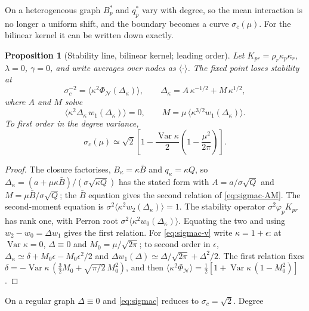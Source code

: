 \documentclass[11pt]{article}
\newcommand{\Var}{\operatorname{Var}}
\newcommand{\PhiN}{\Phi_{\mathcal N}}
\newtheorem{proposition}{Proposition}
\begin{document}
On a heterogeneous graph $B_p^*$ and $q_p^*$ vary with degree, so the mean interaction is no
longer a uniform shift, and the boundary becomes a curve $\sigma_c(\mu)$.  For the bilinear kernel
it can be written down exactly.

\begin{proposition}[Stability line, bilinear kernel; leading order]\label{prop:sigmac}
Let $K_{pr}=\rho_r\kappa_p\kappa_r$, $\lambda=0$, $\gamma=0$, and write averages over nodes as
$\langle\cdot\rangle$.  The fixed point loses stability at
\begin{equation}
  \sigma_c^{-2}=\bigl\langle\kappa^2\PhiN(\Delta_\kappa)\bigr\rangle,\qquad
  \Delta_\kappa=A\,\kappa^{-1/2}+M\,\kappa^{1/2},
  \label{eq:sigmac}
\end{equation}
where $A$ and $M$ solve
\begin{equation}
  \bigl\langle\kappa^2\Delta_\kappa\,w_1(\Delta_\kappa)\bigr\rangle=0,\qquad
  M=\mu\,\bigl\langle\kappa^{3/2}w_1(\Delta_\kappa)\bigr\rangle .
  \label{eq:sigmac-AM}
\end{equation}
To first order in the degree variance,
\begin{equation}
  \sigma_c(\mu)\simeq\sqrt2\left[1-\frac{\Var\kappa}{2}\left(1-\frac{\mu^2}{2\pi}\right)\right].
  \label{eq:sigmac-v}
\end{equation}
\end{proposition}
\begin{proof}
The closure factorises, $B_\kappa=\kappa\bar B$ and $q_\kappa=\kappa Q$, so
$\Delta_\kappa=(a+\mu\kappa\bar B)/(\sigma\sqrt{\kappa Q})$ has the stated form with
$A=a/\sigma\sqrt Q$ and $M=\mu\bar B/\sigma\sqrt Q$; the $\bar B$ equation gives the second relation
of \eqref{eq:sigmac-AM}.  The second-moment equation is $\sigma^2\langle\kappa^2w_2(\Delta_\kappa)\rangle=1$.
The stability operator $\sigma^2\varphi_pK_{pr}$ has rank one, with Perron root
$\sigma^2\langle\kappa^2w_0(\Delta_\kappa)\rangle$.  Equating the two and using $w_2-w_0=\Delta w_1$
gives the first relation.  For \eqref{eq:sigmac-v} write $\kappa=1+\epsilon$: at $\Var\kappa=0$,
$\Delta\equiv0$ and $M_0=\mu/\sqrt{2\pi}$; to second order in $\epsilon$,
$\Delta_\kappa\simeq\delta+M_0\epsilon-M_0\epsilon^2/2$ and $\Delta w_1(\Delta)\simeq\Delta/\sqrt{2\pi}+\Delta^2/2$.
The first relation fixes $\delta=-\Var\kappa\,(\tfrac32M_0+\sqrt{\pi/2}\,M_0^2)$, and then
$\langle\kappa^2\PhiN\rangle=\tfrac12[1+\Var\kappa\,(1-M_0^2)]$.
\end{proof}
On a regular graph $\Delta\equiv0$ and \eqref{eq:sigmac} reduces to $\sigma_c=\sqrt2$.  Degree
\end{document}

